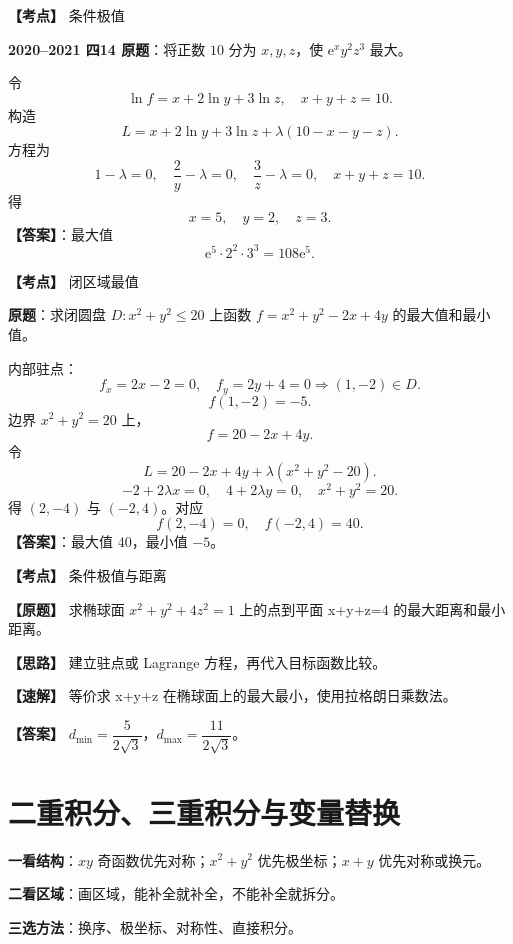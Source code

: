 ﻿\documentclass[11pt,a4paper,UTF8]{ctexart}
\newcommand{\ee}{\mathrm e}
\begin{document}
\begin{answerbox}[2020--2021 四-14]
\textbf{【考点】} 条件极值

\textbf{2020--2021 四14 原题}：将正数 $10$ 分为 $x,y,z$，使 $\ee^xy^2z^3$ 最大。

令
\[
\ln f=x+2\ln y+3\ln z,
\quad x+y+z=10.
\]
构造
\[
L=x+2\ln y+3\ln z+\lambda(10-x-y-z).
\]
方程为
\[
1-\lambda=0,
\quad \frac2y-\lambda=0,
\quad \frac3z-\lambda=0,
\quad x+y+z=10.
\]
得
\[
x=5,
\quad y=2,
\quad z=3.
\]
\textbf{【答案】}：最大值
\[
\ee^5\cdot2^2\cdot3^3=108\ee^5.
\]

\end{answerbox}

\begin{answerbox}[2024--2025 五]
\textbf{【考点】} 闭区域最值

\textbf{原题}：求闭圆盘 $D:x^2+y^2\le20$ 上函数 $f=x^2+y^2-2x+4y$ 的最大值和最小值。

内部驻点：
\[
f_x=2x-2=0,
\quad f_y=2y+4=0
\Rightarrow (1,-2)\in D.
\]
\[
f(1,-2)=-5.
\]
边界 $x^2+y^2=20$ 上，
\[
f=20-2x+4y.
\]
令
\[
L=20-2x+4y+\lambda(x^2+y^2-20).
\]
\[
-2+2\lambda x=0,
\quad 4+2\lambda y=0,
\quad x^2+y^2=20.
\]
得 $(2,-4)$ 与 $(-2,4)$。对应
\[
f(2,-4)=0,
\quad f(-2,4)=40.
\]
\textbf{【答案】}：最大值 $40$，最小值 $-5$。
\end{answerbox}

\newpage

\begin{answerbox}[2022--2023 二-2]
\textbf{【考点】} 条件极值与距离

\textbf{【原题】} 求椭球面 $x^2+y^2+4z^2=1$ 上的点到平面 x+y+z=4 的最大距离和最小距离。

\textbf{【思路】} 建立驻点或 Lagrange 方程，再代入目标函数比较。

\textbf{【速解】} 等价求 x+y+z 在椭球面上的最大最小，使用拉格朗日乘数法。

\textbf{【答案】} $d_{\min}=\dfrac5{2\sqrt3}$，$d_{\max}=\dfrac{11}{2\sqrt3}$。
\end{answerbox}
\section{二重积分、三重积分与变量替换}

\begin{templatebox}[二重积分三区流程]
\textbf{一看结构}：$xy$ 奇函数优先对称；$x^2+y^2$ 优先极坐标；$x+y$ 优先对称或换元。

\textbf{二看区域}：画区域，能补全就补全，不能补全就拆分。

\textbf{三选方法}：换序、极坐标、对称性、直接积分。
\end{templatebox}
\end{document}
